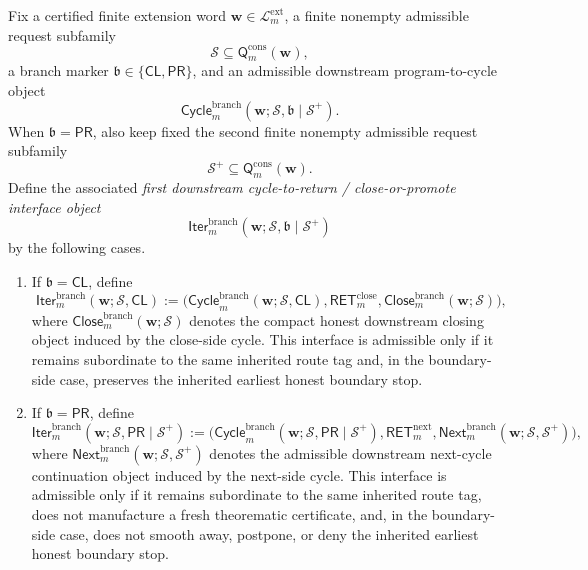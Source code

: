 \begin{definition}
\label{def:first-downstream-cycle-to-return-close-or-promote-interface-object}
Fix a certified finite extension word \(\mathbf w\in\mathcal L^{\mathrm{ext}}_{m}\), a finite nonempty admissible request subfamily
\[
  \mathcal S \subseteq \mathsf{Q}^{\mathrm{cons}}_{m}(\mathbf w),
\]
a branch marker \(\mathfrak b\in\{\mathsf{CL},\mathsf{PR}\}\), and an admissible downstream program-to-cycle object
\[
  \mathsf{Cycle}^{\mathrm{branch}}_{m}(\mathbf w;\mathcal S,\mathfrak b\mid\mathcal S^{+}).
\]
When \(\mathfrak b=\mathsf{PR}\), also keep fixed the second finite nonempty admissible request subfamily
\[
  \mathcal S^{+}\subseteq \mathsf{Q}^{\mathrm{cons}}_{m}(\mathbf w).
\]
Define the associated \emph{first downstream cycle-to-return / close-or-promote interface object}
\[
  \mathsf{Iter}^{\mathrm{branch}}_{m}(\mathbf w;\mathcal S,\mathfrak b\mid\mathcal S^{+})
\]
by the following cases.
\begin{enumerate}[label=(\roman*)]
  \item If \(\mathfrak b=\mathsf{CL}\), define
\[
  \mathsf{Iter}^{\mathrm{branch}}_{m}(\mathbf w;\mathcal S,\mathsf{CL})
  :=
  \bigl(\mathsf{Cycle}^{\mathrm{branch}}_{m}(\mathbf w;\mathcal S,\mathsf{CL}),\mathsf{RET}^{\mathrm{close}}_{m},\mathsf{Close}^{\mathrm{branch}}_{m}(\mathbf w;\mathcal S)\bigr),
\]
where \(\mathsf{Close}^{\mathrm{branch}}_{m}(\mathbf w;\mathcal S)\) denotes the compact honest downstream closing object induced by the close-side cycle. This interface is admissible only if it remains subordinate to the same inherited route tag and, in the boundary-side case, preserves the inherited earliest honest boundary stop.

  \item If \(\mathfrak b=\mathsf{PR}\), define
\[
  \mathsf{Iter}^{\mathrm{branch}}_{m}(\mathbf w;\mathcal S,\mathsf{PR}\mid\mathcal S^{+})
  :=
  \bigl(\mathsf{Cycle}^{\mathrm{branch}}_{m}(\mathbf w;\mathcal S,\mathsf{PR}\mid\mathcal S^{+}),\mathsf{RET}^{\mathrm{next}}_{m},\mathsf{Next}^{\mathrm{branch}}_{m}(\mathbf w;\mathcal S,\mathcal S^{+})\bigr),
\]
where \(\mathsf{Next}^{\mathrm{branch}}_{m}(\mathbf w;\mathcal S,\mathcal S^{+})\) denotes the admissible downstream next-cycle continuation object induced by the next-side cycle. This interface is admissible only if it remains subordinate to the same inherited route tag, does not manufacture a fresh theorematic certificate, and, in the boundary-side case, does not smooth away, postpone, or deny the inherited earliest honest boundary stop.
\end{enumerate}
\end{definition}

